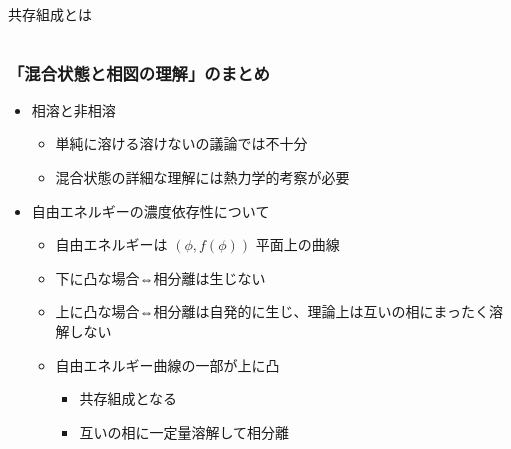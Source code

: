 \documentclass[unicode,12pt]{beamer}%
\begin{document}
\begin{frame}
\begin{alertblock}{共存組成とは}
\begin{columns}[c, onlytextwidth]
			\end{columns}
		\end{alertblock}
\end{frame}

\begin{frame}
	\frametitle{「混合状態と相図の理解」のまとめ}
        \begin{boxnote}
            \vspace{-3mm}
            \begin{itemize}
                \item 相溶と非相溶
                    \begin{itemize}
						\item 単純に溶ける溶けないの議論では不十分
                        \item 混合状態の詳細な理解には熱力学的考察が必要
                    \end{itemize}
				\item 自由エネルギーの濃度依存性について
                    \begin{itemize}
                        \item 自由エネルギーは $(\phi, f(\phi))$ 平面上の曲線
						\item 下に凸な場合⇔相分離は生じない
						\item 上に凸な場合⇔相分離は自発的に生じ、理論上は互いの相にまったく溶解しない
                        \item 自由エネルギー曲線の一部が上に凸
                        \begin{itemize}
							\item 共存組成となる
							\item 互いの相に一定量溶解して相分離
						\end{itemize}
                    \end{itemize} 
            \end{itemize}
        \end{boxnote}
\end{frame}
\end{document}

